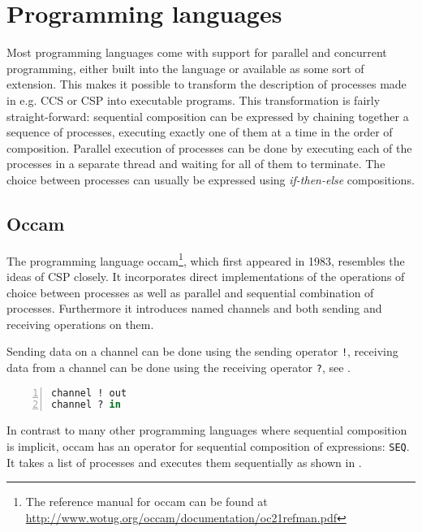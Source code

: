 \section{Programming languages}
Most programming languages come with support for parallel and concurrent programming, either built into the language or available as some sort of extension. This makes it possible to transform the description of processes made in e.g. \textsc{CCS} or \textsc{CSP} into executable programs. This transformation is fairly straight-forward: sequential composition can be expressed by chaining together a sequence of processes, executing exactly one of them at a time in the order of composition. Parallel execution of processes can be done by executing each of the processes in a separate thread and waiting for all of them to terminate. The choice between processes can usually be expressed using \textit{if-then-else} compositions.


\subsection{Occam}
The programming language \textsf{occam}\footnote{The reference manual for \textsf{occam} can be found at \url{http://www.wotug.org/occam/documentation/oc21refman.pdf}}, which first appeared in 1983, resembles the ideas of CSP closely. It incorporates direct implementations of the operations of choice between processes as well as parallel and sequential combination of processes. Furthermore it introduces named channels and both sending and receiving operations on them.

Sending data on a channel can be done using the sending operator \texttt{!}, receiving data from a channel can be done using the receiving operator \texttt{?}, see .

\begin{lstlisting}[language=Caml, caption=Sending data over a channel and receiving data from a channel in \textsf{occam}., label=lst:occam_send_receive, numbers=left, frame=bt]
channel ! out
channel ? in
\end{lstlisting}

In contrast to many other programming languages where sequential composition is implicit, \textsf{occam} has an operator for sequential composition of expressions: \texttt{SEQ}. It takes a list of processes and executes them sequentially as shown in .

